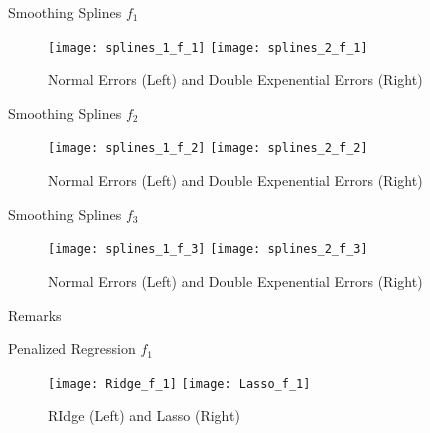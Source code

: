 \documentclass[
  ignorenonframetext,
]{beamer}
\begin{document}
\begin{frame}{Smoothing Splines}
\protect\hypertarget{smoothing-splines}{}
\(f_1\)

\begin{figure}

{\centering \texttt{[image: splines\_1\_f\_1]} \texttt{[image: splines\_2\_f\_1]} 

}

\caption{Normal Errors (Left) and Double Expenential Errors (Right)}\label{fig:splines-plot-1}
\end{figure}
\end{frame}

\begin{frame}{Smoothing Splines}
\protect\hypertarget{smoothing-splines-1}{}
\(f_2\)

\begin{figure}

{\centering \texttt{[image: splines\_1\_f\_2]} \texttt{[image: splines\_2\_f\_2]} 

}

\caption{Normal Errors (Left) and Double Expenential Errors (Right)}\label{fig:splines-plot-2}
\end{figure}
\end{frame}

\begin{frame}{Smoothing Splines}
\protect\hypertarget{smoothing-splines-2}{}
\(f_3\)

\begin{figure}

{\centering \texttt{[image: splines\_1\_f\_3]} \texttt{[image: splines\_2\_f\_3]} 

}

\caption{Normal Errors (Left) and Double Expenential Errors (Right)}\label{fig:splines-plot-3}
\end{figure}
\end{frame}

\begin{frame}{Remarks}
\protect\hypertarget{remarks}{}
\end{frame}

\begin{frame}{Penalized Regression \(f_1\)}
\protect\hypertarget{penalized-regression-f_1}{}
\begin{figure}

{\centering \texttt{[image: Ridge\_f\_1]} \texttt{[image: Lasso\_f\_1]} 

}

\caption{RIdge (Left) and Lasso (Right)}\label{fig:penalized-1}
\end{figure}
\end{frame}
\end{document}
